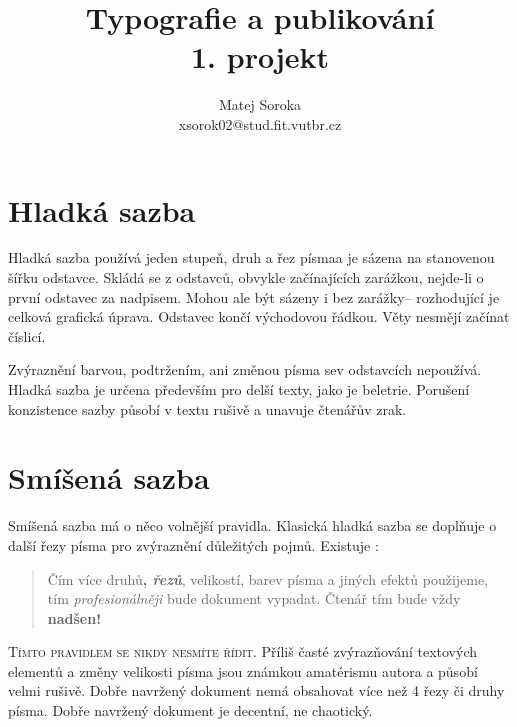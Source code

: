 \documentclass[a4paper,10pt,twocolumn]{article}
\begin{document}
\title{Typografie a publikování\\{\large 1. projekt}}
\author{Matej Soroka\\xsorok02@stud.fit.vutbr.cz}
\date{}

\maketitle

\section{Hladká sazba}
\label{sec:smooth}

Hladká sazba používá jeden stupeň, druh a řez písma\linebreak a je sázena na stanovenou šířku odstavce. Skládá se z odstavců, obvykle začínajících zarážkou, nejde-li o první odstavec za nadpisem. Mohou ale být sázeny i bez zarážky-- rozhodující je celková grafická úprava. Odstavec končí východovou řádkou. Věty nesmějí začínat číslicí.

Zvýraznění barvou, podtržením, ani změnou písma se\linebreak v odstavcích nepoužívá. Hladká sazba je určena především pro delší texty, jako je beletrie. Porušení konzistence sazby působí v textu rušivě a unavuje čtenářův zrak.

\section{Smíšená sazba}\label{2}
\label{sec:mixed}

Smíšená sazba má o něco volnější pravidla. Klasická hladká sazba se doplňuje o další řezy písma pro zvýraznění důležitých pojmů. Existuje :

\begin{quotation}

    Čím více {\ttfamily druhů}{\bfseries , {\itshape řezů}}, velikostí, barev písma a \textsf{jiných efektů} použijeme, tím \emph{profesionálněji} bude dokument vypadat. Čtenář tím {\tiny bude} vždy {\bfseries{\huge nadšen!}}

\end{quotation}

{\scshape Tímto pravidlem se nikdy nesmíte řídit}. Příliš časté zvýrazňování textových elementů a změny velikosti písma jsou známkou amatérismu autora a působí velmi rušivě. Dobře navržený dokument nemá obsahovat více než
4 řezy či druhy písma. Dobře navržený dokument je decentní, ne chaotický.
\end{document}
